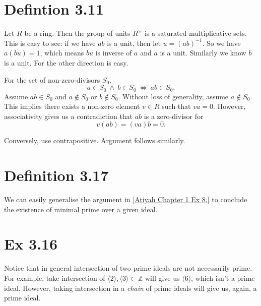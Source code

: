 
\section{Defintion 3.11}

Let $R$ be a ring. Then the group of units $R^{\times}$ is a saturated multiplicative sets. This is easy to see: if we have $ab$ is a unit, then let $u=(ab)^{-1}$. So we have $a(bu)=1$, which means $bu$ is inverse of $a$ and $a$ is a unit. Similarly we know $b$ is a unit. For the other direction is easy.

For the set of non-zero-divisors $S_0$. 
\[a\in S_0 ~\land~ b\in S_0 ~\Leftrightarrow~ ab\in S_0.\]
Assume $ab\in S_0$ and $a\notin S_0$ or $b\notin S_0$. Without loss of generality, assume $a\notin S_0$. This implies there exists a non-zero element $v\in R$ such that $va=0$. However, associativity gives us a contradiction that $ab$ is a zero-divisor for \[v(ab)=(va)b=0.\]

Conversely, use contrapositive. Argument follows similarly.


\section{Definition 3.17}

We can easily generalise the argument in \ref{Atiyah Chapter 1 Ex 8.} to conclude the existence of minimal prime over a given ideal.

\section{Ex 3.16}
Notice that in general intersection of two prime ideals are not necessarily prime. For example, take intersection of $\langle 2\rangle,\langle 3\rangle\subset \mathbb Z$ will give us $\langle 6\rangle$, which isn't a prime ideal. However, taking intersection in a \textit{chain} of prime ideals will give us, again, a prime ideal. 